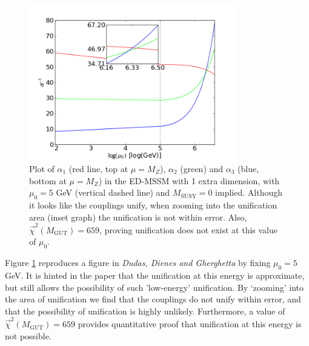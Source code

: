 \documentclass[12pt,a4paper,oneside]{article}
\begin{document}
\begin{figure}[th]
\begin{center}
\includegraphics[width=9cm]{figs/1ed-5gev.png}
\caption[]{Plot of $\alpha_1$ (red line, top at $\mu = M_Z$), $\alpha_2$ (green) and $\alpha_3$ (blue, bottom at $\mu = M_Z$) in the ED-MSSM with 1 extra dimension, with $\mu_0 = 5$ GeV (vertical dashed line) and $M_\mathrm{SUSY} = 0$ implied. Although it looks like the couplings unify, when zooming into the unification area (inset graph) the unification is not within error. Also, $\overrightarrow{\chi}^2 (M_\mathrm{GUT}) = 659$, proving unification does not exist at this value of $\mu_0$.}
\label{fig:ed-mssm-ddg}
\end{center}
\end{figure}

Figure \ref{fig:ed-mssm-ddg} reproduces a figure in \textit{Dudas, Dienes and Gherghetta} by fixing $\mu_0 = 5$ GeV. It is hinted in the paper that the unification at this energy is approximate, but still allows the possibility of such 'low-energy' unification. By `zooming' into the area of unification we find that the couplings do not unify within error, and that the possibility of unification is highly unlikely. Furthermore, a value of $\overrightarrow{\chi}^2 (M_\mathrm{GUT}) = 659$ provides quantitative proof that unification at this energy is not possible.
\end{document}
